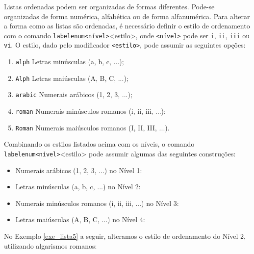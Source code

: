 Listas ordenadas podem ser organizadas de formas diferentes. Pode-se organizadas de forma numérica, alfabética ou de forma alfanumérica. Para alterar a forma como as listas são ordenadas, é necessário definir o estilo de ordenamento com o comando \texttt{labelenum<nível>}{<estilo>}, onde {\tt <nível>} pode ser {\tt i}, {\tt ii}, {\tt iii} ou {\tt vi}. O estilo, dado pelo modificador {\tt <estilo>}, pode assumir as seguintes opções:

\begin{enumerate}
    \item {\tt alph} Letras minúsculas (a, b, c, ...);
    \item {\tt Alph} Letras maiúsculas (A, B, C, ...);
    \item {\tt arabic} Numerais arábicos (1, 2, 3, ...);
    \item {\tt roman} Numerais minúsculos romanos (i, ii, iii, ...);
    \item {\tt Roman} Numerais maiúsculos romanos (I, II, III, ...).
\end{enumerate}

Combinando os estilos listados acima com os níveis, o comando \texttt{labelenum<nível>}{<estilo>} pode assumir algumas das seguintes construções:

\begin{itemize}
    \item Numerais arábicos (1, 2, 3, ...) no Nível 1:\\
    \texttt{\renewcommand{\labelenumi}{\arabic{enumi}}}
    \item Letras minúsculas (a, b, c, ...) no Nível 2:\\ \texttt{\renewcommand{\labelenumii}{\alph{enumii}}}
    \item Numerais minúsculos romanos (i, ii, iii, ...) no Nível 3:\\ \texttt{\renewcommand{\labelenumiii}{\roman{enumiii}}}
    \item Letras maiúsculas (A, B, C, ...) no Nível 4:\\ \texttt{\renewcommand{\labelenumiv}{\Alph{enumiv}}}
\end{itemize}

No Exemplo \ref{exe_lista5} a seguir, alteramos o estilo de ordenamento do Nível 2, utilizando algarismos romanos:


